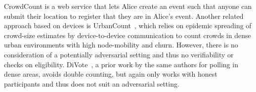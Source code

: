 CrowdCount \citet{CrowdCount} is a web service that lets Alice create an event such that anyone can submit their location to register that they are in Alice's event.
Another related approach based on devices is UrbanCount~\cite{UrbanCount}, which relies on epidemic spreading of crowd-size estimates by device-to-device communication to count crowds in dense urban environments with high node-mobility and churn.
However, there is no consideration of a potentially adversarial setting and thus no verifiability or checks on eligibility.  DiVote~\cite{DiVote}, a prior work by the same authors for polling in dense areas, avoids double counting, but again only works with honest participants and thus does not suit an adversarial setting.

%
